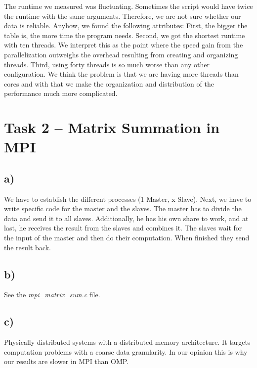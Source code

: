 \documentclass[a4paper,11pt]{article}
\theoremstyle{mytheor}
\begin{document}
The runtime we measured was fluctuating. Sometimes the script would have twice the runtime with the same arguments. Therefore, we are not sure whether our data is reliable. Anyhow, we found the following attributes: First, the bigger the table is, the more time the program needs. Second, we got the shortest runtime with ten threads. We interpret this as the point where the speed gain from the parallelization outweighs the overhead resulting from creating and organizing threads. Third, using forty threads is so much worse than any other configuration. We think the problem is that we are having more threads than cores and with that we make the organization and distribution of the performance much more complicated.

\section*{Task 2 -- Matrix Summation in MPI}
\subsection*{a)}
We have to establish the different processes (1 Master, x Slave). Next, we have to write specific code for the master and the slaves. The master has to divide the data and send it to all slaves. Additionally, he has his own share to work, and at last, he receives the result from the slaves and combines it. The slaves wait for the input of the master and then do their computation. When finished they send the result back.

\subsection*{b)}
See the \emph{mpi\_matrix\_sum.c} file.

\subsection*{c)}
Physically distributed systems with a distributed-memory architecture. It targets computation problems with a coarse data granularity. In our opinion this is why our results are slower in MPI than OMP.
\end{document}
